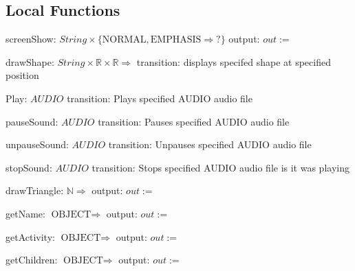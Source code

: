 \documentclass[12pt]{article}
\begin{document}
\subsection*{Local Functions}

\noindent screenShow: $String\times\{\mbox{NORMAL},\mbox{EMPHASIS}\Rightarrow?\}$
\noindent output: $out := $

\noindent drawShape: $String\times\mathbb{R}\times\mathbb{R}\Rightarrow$
\noindent transition: displays specifed shape at specified position

\noindent Play: $AUDIO$
\noindent transition: Plays specified AUDIO audio file

\noindent pauseSound: $AUDIO$
\noindent transition: Pauses specified AUDIO audio file

\noindent unpauseSound: $AUDIO$
\noindent transition: Unpauses specified AUDIO audio file

\noindent stopSound: $AUDIO$
\noindent transition: Stops specified AUDIO audio file is it was playing



\noindent drawTriangle: $ \mathbb{N} \Rightarrow $
\noindent output: $out := $

\noindent getName: $ \mbox{OBJECT} \Rightarrow $
\noindent output: $out := $

\noindent getActivity: $ \mbox{OBJECT} \Rightarrow $
\noindent output: $out := $

\noindent getChildren: $ \mbox{OBJECT} \Rightarrow $
\noindent output: $out := $





\end{document}
